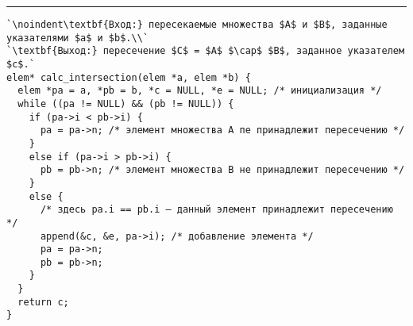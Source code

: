 \vspace{5pt} \hrule
\begin{lstlisting}[caption={Вычисление пересечения слиянием}, label=p44_merge_intersection_calculation, escapechar=`]
`\noindent\textbf{Вход:} пересекаемые множества $A$ и $B$, заданные указателями $a$ и $b$.\\`
`\textbf{Выход:} пересечение $C$ = $A$ $\cap$ $B$, заданное указателем $c$.`
elem* calc_intersection(elem *a, elem *b) {
  elem *pa = a, *pb = b, *c = NULL, *e = NULL; /* инициализация */
  while ((pa != NULL) && (pb != NULL)) {
    if (pa->i < pb->i) {
      pa = pa->n; /* элемент множества A пе принадлежит пересечению */
    }
    else if (pa->i > pb->i) {
      pb = pb->n; /* элемент множества B не принадлежит пересечению */
    }
    else {
      /* здесь pa.i == pb.i — данный элемент принадлежит пересечению */
      append(&c, &e, pa->i); /* добавление элемента */
      pa = pa->n;
      pb = pb->n;
    }
  }
  return c;
}
\end{lstlisting}
